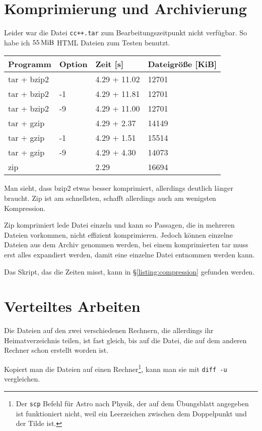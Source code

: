 \documentclass[12pt]{report}
\begin{document}



\section{Komprimierung und Archivierung}

Leider war die Datei \texttt{cc++.tar} zum Bearbeitungszeitpunkt nicht verfügbar. So habe ich $\unit[55]{MiB}$ HTML Dateien zum Testen benutzt.

\begin{tabular}{llll}
\label{table:compression-results}
Programm & Option & Zeit [s] & Dateigröße [KiB] \\
\hline
tar + bzip2 &  & 4.29 + 11.02 & 12701 \\
tar + bzip2 & -1 & 4.29 + 11.81 & 12701 \\
tar + bzip2 & -9 & 4.29 + 11.00 & 12701 \\
tar + gzip &  & 4.29 + 2.37 & 14149 \\
tar + gzip & -1 & 4.29 + 1.51 & 15514 \\
tar + gzip & -9 & 4.29 + 4.30 & 14073 \\
zip &  & 2.29 & 16694\\
\end{tabular}

Man sieht, dass bzip2 etwas besser komprimiert, allerdings deutlich länger braucht. Zip ist am schnellsten, schafft allerdings auch am wenigsten Kompression.

Zip komprimiert lede Datei einzeln und kann so Passagen, die in mehreren Dateien vorkommen, nicht effizient komprimieren. Jedoch können einzelne Dateien aus dem Archiv genommen werden, bei einem komprimierten tar muss erst alles expandiert werden, damit eine einzelne Datei entnommen werden kann.

Das Skript, das die Zeiten misst, kann in §\ref{listing:compression} gefunden werden.


\section{Verteiltes Arbeiten}

Die Dateien auf den zwei verschiedenen Rechnern, die allerdings ihr Heimatverzeichnis teilen, ist fast gleich, bis auf die Datei, die auf dem anderen Rechner schon erstellt worden ist.

Kopiert man die Dateien auf einen Rechner\footnote{Der \texttt{scp} Befehl für Astro nach Physik, der auf dem Übungsblatt angegeben ist funktioniert nicht, weil ein Leerzeichen zwischen dem Doppelpunkt und der Tilde ist.}, kann man sie mit \texttt{diff -u} vergleichen.
\end{document}
